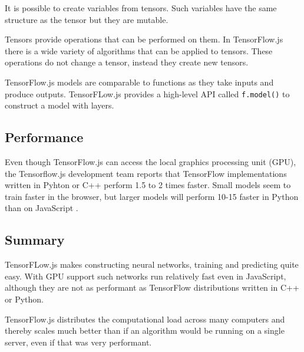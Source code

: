 

It is possible to create variables from tensors. Such variables have the same structure as the tensor but they 
are mutable.



Tensors provide operations that can be performed on them. In TensorFlow.js there is a wide variety
of algorithms that can be applied to tensors.
These operations do not change a tensor, instead they create new tensors.



TensorFlow.js models are comparable  to functions as they  take inputs and produce outputs.
TensorFLow.js provides a high-level API called \texttt{f.model()} to construct a model with layers.



\subsection{Performance}

Even though TensorFlow.js can access the local graphics processing unit (GPU), 
the Tensorflow.js development team reports that TensorFlow implementations 
written in Pyhton or C++ perform 1.5 to 2 times faster.
Small models seem to train faster in the browser, but larger models will 
perform 10-15 faster in Python than on JavaScript \cite{TenosrFLowJs}.

\subsection{Summary}
TensorFLow.js makes constructing neural networks, training and predicting quite easy.
With GPU support such networks run relatively fast even in JavaScript, although 
they are not as performant as TensorFlow distributions
written in C++ or Python. 

TensorFlow.js  distributes the computational load 
across many computers and thereby scales much better than if an algorithm would be running on a single
server, even if that was very performant.
